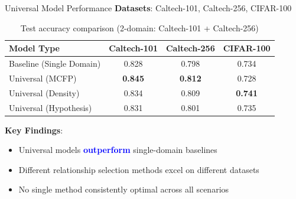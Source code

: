 \documentclass[aspectratio=169]{beamer}
\begin{document}
\begin{frame}{Universal Model Performance}
    \textbf{Datasets}: Caltech-101, Caltech-256, CIFAR-100

    \begin{table}[h]
        \centering
        \scriptsize
        \begin{tabular}{lccc}
            \toprule
            \textbf{Model Type}      & \textbf{Caltech-101} & \textbf{Caltech-256} & \textbf{CIFAR-100} \\
            \midrule
            Baseline (Single Domain) & 0.828                & 0.798                & 0.734              \\
            Universal (MCFP)         & \textbf{0.845}       & \textbf{0.812}       & 0.728              \\
            Universal (Density)      & 0.834                & 0.809                & \textbf{0.741}     \\
            Universal (Hypothesis)   & 0.831                & 0.801                & 0.735              \\
            \bottomrule
        \end{tabular}
        \caption{Test accuracy comparison (2-domain: Caltech-101 + Caltech-256)}
    \end{table}

    \vspace{1em}

    \textbf{Key Findings}:
    \begin{itemize}
        \item Universal models \textcolor{blue}{\textbf{outperform}} single-domain baselines
        \item Different relationship selection methods excel on different datasets
        \item No single method consistently optimal across all scenarios
    \end{itemize}
\end{frame}
\end{document}
